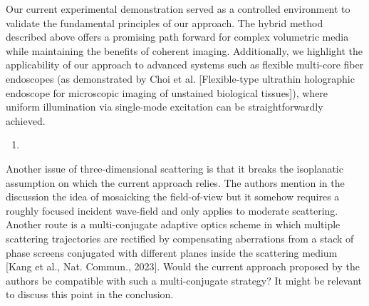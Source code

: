 \documentclass[12pt]{article}
\newenvironment{solved_reviewercomment}
    {\begin{tcolorbox}[width=\linewidth,colback=gray!5,colframe=solved_commentcolor!50,title=Reviewer Comment,left=5pt,right=5pt]}
    {\end{tcolorbox}}
\newenvironment{ourresponse}
    {\begin{tcolorbox}[width=\linewidth,breakable,enhanced,colback=gray!5,colframe=responsecolor!50,title=Response,left=5pt,right=5pt]}
    {\end{tcolorbox}}
\begin{document}
\begin{ourresponse}
    Our current experimental demonstration served as a controlled environment to validate the fundamental principles of our approach. The hybrid method described above offers a promising path forward for complex volumetric media while maintaining the benefits of coherent imaging. Additionally, we highlight the applicability of our approach to advanced systems such as flexible multi-core fiber endoscopes (as demonstrated by Choi et al. [Flexible-type ultrathin holographic endoscope for microscopic imaging of unstained biological tissues]), where uniform illumination via single-mode excitation can be straightforwardly achieved.
\end{ourresponse}


\begin{enumerate}[label=\arabic*., resume]
\item \leavevmode
\end{enumerate}
\vspace{-1em}
\begin{solved_reviewercomment}
    Another issue of three-dimensional scattering is that it breaks the isoplanatic assumption on which the current approach relies. The authors mention in the discussion the idea of mosaicking the field-of-view but it somehow requires a roughly focused incident wave-field and only applies to moderate scattering. Another route is a multi-conjugate adaptive optics scheme in which multiple scattering trajectories are rectified by compensating aberrations from a stack of phase screens conjugated with different planes inside the scattering medium [Kang et al., Nat. Commun., 2023]. Would the current approach proposed by the authors be compatible with such a multi-conjugate strategy? It might be relevant to discuss this point in the conclusion.
\end{solved_reviewercomment}
\end{document}
